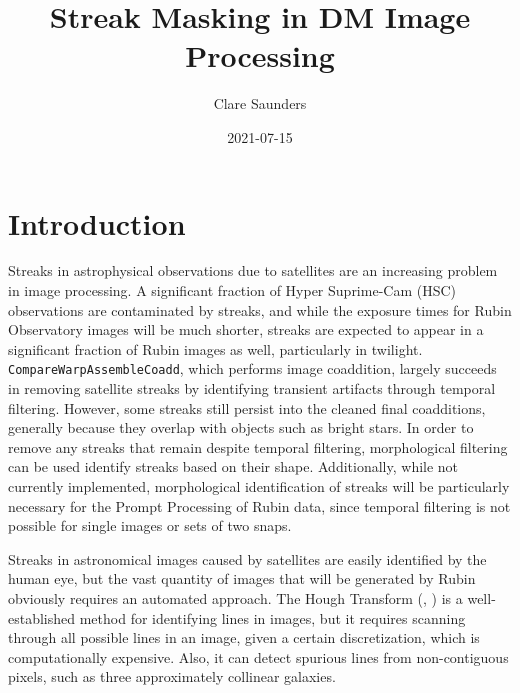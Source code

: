 \documentclass[DM,authoryear,toc]{lsstdoc}
\title{Streak Masking in DM Image Processing}
\author{%
Clare Saunders
}
\date{2021-07-15}
\begin{document}
\maketitle

\section{Introduction}
Streaks in astrophysical observations due to satellites are an increasing problem in image processing. A significant fraction of Hyper Suprime-Cam (HSC) observations are contaminated by streaks, and while the exposure times for Rubin Observatory images will be much shorter, streaks are expected to appear in a significant fraction of Rubin images as well, particularly in twilight. \texttt{CompareWarpAssembleCoadd}, which performs image coaddition, largely succeeds in removing satellite streaks by identifying transient artifacts through temporal filtering. However, some streaks still persist into the cleaned final coadditions, generally because they overlap with objects such as bright stars. In order to remove any streaks that remain despite temporal filtering, morphological filtering can be used identify streaks based on their shape. Additionally, while not currently implemented, morphological identification of streaks will be particularly necessary for the Prompt Processing of Rubin data, since temporal filtering is not possible for single images or sets of two snaps. 

Streaks in astronomical images caused by satellites are easily identified by the human eye, but the vast quantity of images that will be generated by Rubin obviously requires an automated approach. The Hough Transform (\citealt{Hough:1962}, \citealt{Douda:1972}) is a well-established method for identifying lines in images, but it requires scanning through all possible lines in an image, given a certain discretization, which is computationally expensive. Also, it can detect spurious lines from non-contiguous pixels, such as three approximately collinear galaxies.
\end{document}
